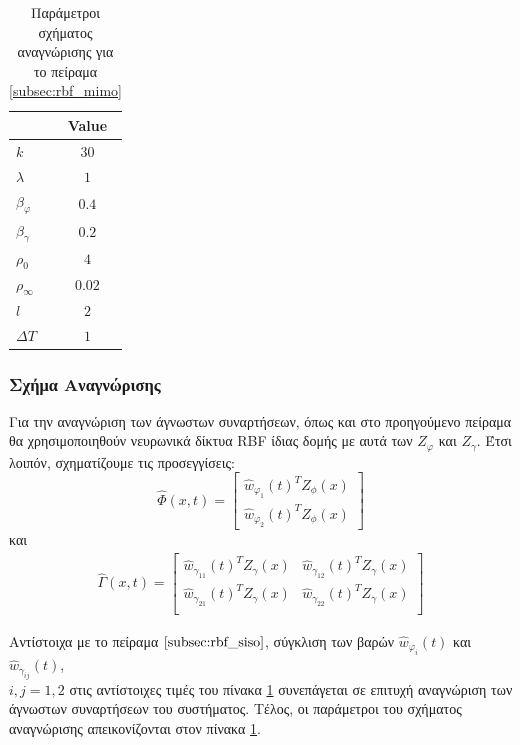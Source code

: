 {
\begin{table}
	\centering
	\captionsetup{format=plain}
	\begin{tabular}{ l | c }
		\hline\hline
		\text{Parameter}  & Value  \\ \hline\hline
		$k$               & $30$   \\ \hline
		$\lambda$         & $1 $   \\ \hline
		$\beta_{\varphi}$ & $0.4$  \\ \hline
		$\beta_{\gamma}$  & $0.2$  \\ \hline
		$\rho_0      $    & $4$    \\ \hline
		$\rho_\infty $    & $0.02$ \\ \hline
		$l           $    & $2$    \\ \hline
		$\textit{ΔΤ} $    & $1$    \\ \hline \hline	
	\end{tabular}
	\caption{Παράμετροι σχήματος αναγνώρισης για το πείραμα \ref{subsec:rbf_mimo}}
	\label{tab:rbf_mimo_params}
\end{table}
\subsubsection{Σχήμα Αναγνώρισης}
Για την αναγνώριση των άγνωστων συναρτήσεων, όπως και στο προηγούμενο πείραμα θα χρησιμοποιηθούν νευρωνικά δίκτυα RBF ίδιας δομής με αυτά των $Z_\varphi$ και $Z_\gamma$. Έτσι λοιπόν, σχηματίζουμε τις προσεγγίσεις:
\begin{equation*}
\hat{\Phi}(x,t)  =  
\begin{bmatrix}
\hat{w}_{\varphi_1}(t)^T Z_\phi(x) \\
\hat{w}_{\varphi_2}(t)^T Z_\phi(x)
\end{bmatrix}
\end{equation*}
και
\begin{equation*}
\begin{matrix}
\hat{\Gamma}(x,t) = \begin{bmatrix}
\hat{w}_{\gamma_{11}}(t)^T Z_\gamma(x) 
& \hat{w}_{\gamma_{12}}(t)^T Z_\gamma(x) \\
\hat{w}_{\gamma_{21}}(t)^T Z_\gamma(x) 
& \hat{w}_{\gamma_{22}}(t)^T Z_\gamma(x) \\
\end{bmatrix}
\end{matrix}
\end{equation*}

Αντίστοιχα με το πείραμα $\ref{subsec:rbf_siso}$, σύγκλιση των βαρών $\hat{w}_{\varphi_i}(t)$ και $\hat{w}_{\gamma_{ij}}(t)$,\\ $i,j = 1,2$ στις αντίστοιχες τιμές του πίνακα \ref{tab:rbf_mimo_params} συνεπάγεται σε επιτυχή αναγνώριση των άγνωστων συναρτήσεων του συστήματος. Τέλος, οι παράμετροι του σχήματος αναγνώρισης απεικονίζονται στον πίνακα \ref{tab:rbf_mimo_params}.
}

